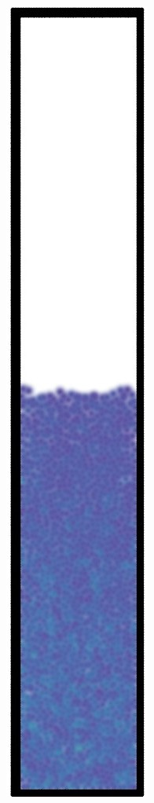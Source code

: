 \begin{figure}[h]
  \centering
  \begin{subfigure}[t]{0.1\textwidth}
    \centering
    \includegraphics*[width=\textwidth]{images/stability/eos.jpg}

\end{subfigure}
\end{figure}
